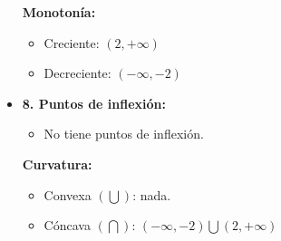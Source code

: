 \begin{itemize}
\begin{itemize}
	\end{itemize}
	\textbf{Monotonía: }
	\begin{itemize}
		\item Creciente: $(2, +\infty)$
		\item Decreciente: $(-\infty, -2)$
	\end{itemize}
	\item \textbf{8. Puntos de inflexión: }\\
	\begin{itemize}
		\item No tiene puntos de inflexión.
	\end{itemize}
	\textbf{Curvatura: }
	\begin{itemize}
		\item Convexa $(\bigcup)$: nada.
		\item Cóncava $(\bigcap)$: $(-\infty, -2) \bigcup (2, +\infty)$
	\end{itemize}
\end{itemize}

